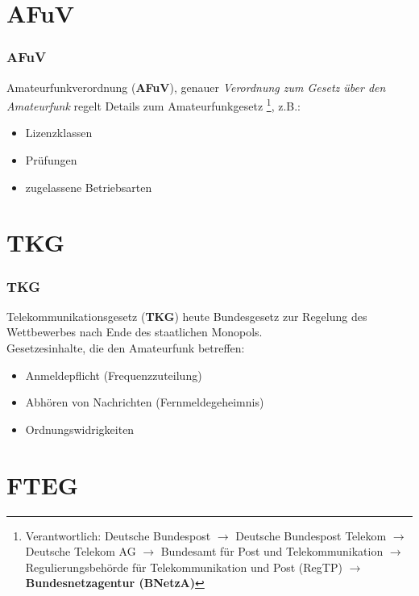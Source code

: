 \section{AFuV}

\begin{frame}
  \frametitle{AFuV}

  Amateurfunkverordnung (\textbf{AFuV}), genauer \emph{Verordnung zum Gesetz
  über den Amateurfunk} regelt Details zum Amateurfunkgesetz
  \footnote{Verantwortlich: Deutsche Bundespost $\rightarrow$ Deutsche
  Bundespost Telekom $\rightarrow$ Deutsche Telekom AG $\rightarrow$
  Bundesamt für Post und Telekommunikation $\rightarrow$ Regulierungsbehörde
  für Telekommunikation und Post (RegTP) $\rightarrow$
  \textbf{Bundesnetzagentur (BNetzA)}}, z.B.:

  \begin{itemize}
    \item Lizenzklassen
    \item Prüfungen
    \item zugelassene Betriebsarten
  \end{itemize}

\end{frame}

\section{TKG}

\begin{frame}
  \frametitle{TKG}

  Telekommunikationsgesetz (\textbf{TKG}) heute Bundesgesetz zur Regelung des
  Wettbewerbes nach Ende des staatlichen Monopols. \\[1em]

  Gesetzesinhalte, die den Amateurfunk betreffen:

  \begin{itemize}
    \item Anmeldepflicht (Frequenzzuteilung)
    \item Abhören von Nachrichten (Fernmeldegeheimnis)
    \item Ordnungswidrigkeiten
  \end{itemize}

\end{frame}

\section{FTEG}

